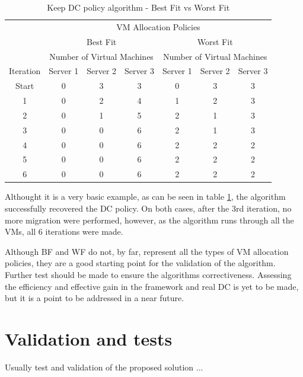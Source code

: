 \documentclass[12pt,english,oneside]{book}
\begin{document}
\begin{table}[h!tbp]
\begin{tabular}{lc|c|c||c|c|c|}
& \multicolumn{6}{c}{VM Allocation Policies} \\
\cline{2-7}
\multicolumn{1}{c|}{}& \multicolumn{3}{c||}{Best Fit} & \multicolumn{3}{c|}{Worst Fit} \\
\cline{2-7}
\multicolumn{1}{c|}{}& \multicolumn{3}{|c||}{Number of Virtual Machines}& \multicolumn{3}{c|}{Number of Virtual Machines} \\
\hline
\multicolumn{1}{|c|}{Iteration} & Server 1 & Server 2 & Server 3 & Server 1 & Server 2 & Server 3 \\
\hline
\multicolumn{1}{|c|}{Start} & 0 & 3 & 3 & 0 & 3 & 3 \\
\multicolumn{1}{|c|}{1} & 0 & 2 & 4 & 1 & 2 & 3 \\
\multicolumn{1}{|c|}{2} & 0 & 1 & 5 & 2 & 1 & 3 \\
\multicolumn{1}{|c|}{3} & 0 & 0 & 6 & 2 & 1 & 3 \\
\multicolumn{1}{|c|}{4} & 0 & 0 & 6 & 2 & 2 & 2 \\
\multicolumn{1}{|c|}{5} & 0 & 0 & 6 & 2 & 2 & 2 \\
\multicolumn{1}{|c|}{6} & 0 & 0 & 6 & 2 & 2 & 2 \\
\hline
\end{tabular}
\caption{Keep DC policy algorithm - Best Fit vs Worst Fit}
\label{table:keepdcpol}
\end{table}

Althought it is a very basic example, as can be seen in table \ref{table:keepdcpol}, the algorithm successfully recovered the DC policy.
On both cases, after the $3$rd iteration, no more migration were performed, however, as the algorithm runs through all the VMs, all $6$ iterations were made.

Although BF and WF do not, by far, represent all the types of VM allocation policies, they are a good starting point for the validation of the algorithm.
Further test should be made to ensure the algorithms correctiveness.
Assessing the efficiency and effective gain in the framework and real DC is yet to be made, but it is a point to be addressed in a near future.

\chapter{Validation and tests \label{cha:valtes} }

Usually test and validation of the proposed solution ...
\end{document}
